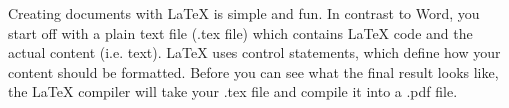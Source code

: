 \documentclass{article}
\begin{document}
Creating documents with LaTeX is simple and fun. In contrast to Word, you start off with a plain text file (.tex file) which contains LaTeX code and the actual content (i.e. text). LaTeX uses control statements, which define how your content should be formatted. Before you can see what the final result looks like, the LaTeX compiler will take your .tex file and compile it into a .pdf file.
\end{document}
